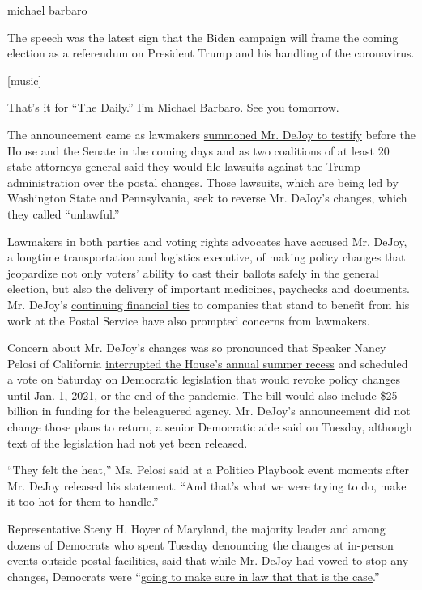 michael barbaro

The speech was the latest sign that the Biden campaign will frame the
coming election as a referendum on President Trump and his handling of
the coronavirus.

{[}music{]}

That's it for ``The Daily.'' I'm Michael Barbaro. See you tomorrow.

The announcement came as lawmakers
\href{https://www.nytimes3xbfgragh.onion/2020/08/18/us/elections/louis-dejoy-the-postmaster-general-will-testify-before-the-senate-on-friday-about-service-cuts.html}{summoned
Mr. DeJoy to testify} before the House and the Senate in the coming days
and as two coalitions of at least 20 state attorneys general said they
would file lawsuits against the Trump administration over the postal
changes. Those lawsuits, which are being led by Washington State and
Pennsylvania, seek to reverse Mr. DeJoy's changes, which they called
``unlawful.''

Lawmakers in both parties and voting rights advocates have accused Mr.
DeJoy, a longtime transportation and logistics executive, of making
policy changes that jeopardize not only voters' ability to cast their
ballots safely in the general election, but also the delivery of
important medicines, paychecks and documents. Mr. DeJoy's
\href{https://www.nytimes3xbfgragh.onion/2020/08/17/us/politics/dejoy-postal-service-mail-in-voting.html}{continuing
financial ties} to companies that stand to benefit from his work at the
Postal Service have also prompted concerns from lawmakers.

Concern about Mr. DeJoy's changes was so pronounced that Speaker Nancy
Pelosi of California
\href{https://www.nytimes3xbfgragh.onion/2020/08/16/us/politics/coronavirus-postal-service-stimulus-bill.html}{interrupted
the House's annual summer recess} and scheduled a vote on Saturday on
Democratic legislation that would revoke policy changes until Jan. 1,
2021, or the end of the pandemic. The bill would also include \$25
billion in funding for the beleaguered agency. Mr. DeJoy's announcement
did not change those plans to return, a senior Democratic aide said on
Tuesday, although text of the legislation had not yet been released.

``They felt the heat,'' Ms. Pelosi said at a Politico Playbook event
moments after Mr. DeJoy released his statement. ``And that's what we
were trying to do, make it too hot for them to handle.''

Representative Steny H. Hoyer of Maryland, the majority leader and among
dozens of Democrats who spent Tuesday denouncing the changes at
in-person events outside postal facilities, said that while Mr. DeJoy
had vowed to stop any changes, Democrats were
``\href{https://www.majorityleader.gov/content/hoyer-remarks-press-conference-outside-usps-hq-postal-day-action}{going
to make sure in law that that is the case}.''

